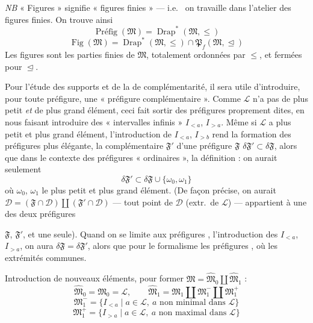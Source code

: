 \documentclass[11pt,a4paper]{article}
\begin{document}
\emph{NB} « Figures » signifie « figures finies » --- i.e.\  on travaille dans l'atelier des figures finies. On trouve ainsi
\[
  \operatorname{Préfig}(\mathfrak{M}) = \operatorname{Drap}^{*}(\mathfrak{M}, \leq)
\]
\[
  \operatorname{Fig}(\mathfrak{M}) = \operatorname{Drap}^{*}(\mathfrak{M}, \leq) \cap \mathfrak{P}_f(\mathfrak{M}, \trianglelefteq)
\]
Les figures sont les parties finies de $\mathfrak{M}$, totalement ordonnées par $\leq$, et fermées pour $\trianglelefteq$.

Pour l'étude des supports  et de la  de complémentarité, il sera utile d'introduire, pour toute préfigure, une « préfigure complémentaire ». Comme $\mathcal{L}$ n'a pas de plus petit \emph{et} de plus grand élément, ceci fait sortir des préfigures proprement dites, en nous faisant introduire des « intervalles infinis » $I_{<a}$, $I_{>a}$. Même si $\mathcal{L}$ a plus petit et plus grand élément, l'introduction de $I_{<a}$, $I_{>b}$ rend la formation des préfigures plus élégante,  la complémentaire $\mathfrak{F}'$ d'une préfigure $\mathfrak{F}$  $\delta \mathfrak{F}' \subset \delta \mathfrak{F}$, alors que  dans le contexte des préfigures « ordinaires », la définition   : on aurait seulement
\[
  \delta \mathfrak{F}' \subset \delta \mathfrak{F} \cup \{\omega_0, \omega_1\}
\]
où $\omega_0$, $\omega_1$  le plus petit et plus grand élément. (De façon précise, on aurait $\mathcal{D} = (\mathfrak{F} \cap \mathcal{D}) \amalg (\mathfrak{F}' \cap \mathcal{D})$ --- tout point de $\mathcal{D}$ (extr.\ de $\mathcal{L}$) --- appartient à une des deux préfigures


$\mathfrak{F}$, $\mathfrak{F}'$, et une seule).  Quand on se limite aux préfigures  , \struck{\ill{}} l'introduction des $I_{<a}$, $I_{>a}$, on aura $\delta\mathfrak{F} = \delta\mathfrak{F}'$, alors que  pour le formalisme \ill{} les préfigures  , où les extrémités \add{\ill{}} \ill{} communes.

Introduction de nouveaux éléments, pour former $\widehat{\mathfrak{M}} = \widehat{\mathfrak{M}}_0 \amalg \widehat{\mathfrak{M}}_1$ :
\[
  \widehat{\mathfrak{M}}_0 = \mathfrak{M}_0 = \mathcal{L} , \qquad
  \widehat{\mathfrak{M}}_1 = \mathfrak{M}_1 \amalg \mathfrak{M}_1^{-} \amalg \mathfrak{M}_1^{+}
\]
\[
  \mathfrak{M}_1^{-} = \{ I_{<a} \mid a \in \mathcal{L},\ a \text{ non minimal dans } \mathcal{L} \}
\]
\[
  \mathfrak{M}_1^{+} = \{ I_{>a} \mid a \in \mathcal{L},\ a \text{ non maximal dans } \mathcal{L} \}
\]
\end{document}
